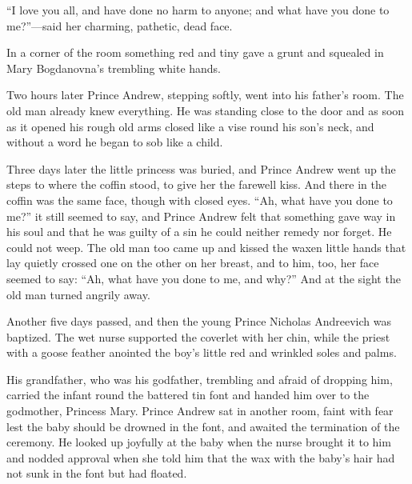 ``I love you all, and have done no harm to anyone; and what have
you done to me?''---said her charming, pathetic, dead face.

In a corner of the room something red and tiny gave a grunt and
squealed in Mary Bogdanovna's trembling white hands.

Two hours later Prince Andrew, stepping softly, went into his
father's room. The old man already knew everything. He was
standing close to the door and as soon as it opened his rough old
arms closed like a vise round his son's neck, and without a word
he began to sob like a child.

Three days later the little princess was buried, and Prince
Andrew went up the steps to where the coffin stood, to give her
the farewell kiss.  And there in the coffin was the same face,
though with closed eyes. ``Ah, what have you done to me?'' it
still seemed to say, and Prince Andrew felt that something gave
way in his soul and that he was guilty of a sin he could neither
remedy nor forget. He could not weep. The old man too came up and
kissed the waxen little hands that lay quietly crossed one on the
other on her breast, and to him, too, her face seemed to say:
``Ah, what have you done to me, and why?'' And at the sight the
old man turned angrily away.

Another five days passed, and then the young Prince Nicholas
Andreevich was baptized. The wet nurse supported the coverlet
with her chin, while the priest with a goose feather anointed the
boy's little red and wrinkled soles and palms.

His grandfather, who was his godfather, trembling and afraid of
dropping him, carried the infant round the battered tin font and
handed him over to the godmother, Princess Mary. Prince Andrew
sat in another room, faint with fear lest the baby should be
drowned in the font, and awaited the termination of the
ceremony. He looked up joyfully at the baby when the nurse
brought it to him and nodded approval when she told him that the
wax with the baby's hair had not sunk in the font but had
floated.


